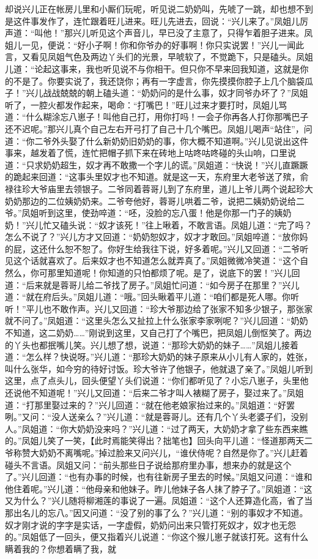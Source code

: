\documentclass[12pt,oneside]{book}
\begin{document}
却说兴儿正在帐房儿里和小厮们玩呢，听见说二奶奶叫，先唬了一跳，却也想不到是这件事发作了，连忙跟着旺儿进来。旺儿先进去，回说：“兴儿来了。”凤姐儿厉声道：“叫他！”那兴儿听见这个声音儿，早已没了主意了，只得乍着胆子进来。凤姐儿一见，便说：“好小子啊！你和你爷办的好事啊！你只实说罢！”兴儿一闻此言，又看见凤姐气色及两边丫头们的光景，早唬软了，不觉跪下，只是磕头。凤姐儿道：“论起这事来，我也听见说不与你相干。但只你不早来回我知道，这就是你的不是了。你要实说了，我还饶你；再有一字虚言，你先摸摸你腔子上几个脑袋瓜子！”兴儿战战兢兢的朝上磕头道：“奶奶问的是什么事，奴才同爷办坏了？”凤姐听了，一腔火都发作起来，喝命：“打嘴巴！”旺儿过来才要打时，凤姐儿骂道：“什么糊涂忘八崽子！叫他自己打，用你打吗！一会子你再各人打你那嘴巴子还不迟呢。”那兴儿真个自己左右开弓打了自己十几个嘴巴。凤姐儿喝声“站住”，问道：“你二爷外头娶了什么新奶奶旧奶奶的事，你大概不知道啊。”兴儿见说出这件事来，越发着了慌，连忙把帽子抓下来在砖地上咕咚咕咚碰的头山响，口里说道：“只求奶奶超生，奴才再不敢撒一个字儿的谎。”凤姐道：“快说！”兴儿直蹶蹶的跪起来回道：“这事头里奴才也不知道。就是这一天，东府里大老爷送了殡，俞禄往珍大爷庙里去领银子。二爷同着蓉哥儿到了东府里，道儿上爷儿两个说起珍大奶奶那边的二位姨奶奶来。二爷夸他好，蓉哥儿哄着二爷，说把二姨奶奶说给二爷。”凤姐听到这里，使劲啐道：“呸，没脸的忘八蛋！他是你那一门子的姨奶奶！”兴儿忙又磕头说：“奴才该死！”往上啾着，不敢言语。凤姐儿道：“完了吗？怎么不说了？”兴儿方才又回道：“奶奶恕奴才，奴才才敢回。”凤姐啐道：“放你妈的屁，这还什么恕不恕了。你好生给我往下说，好多着呢。”兴儿又回道：“二爷听见这个话就喜欢了。后来奴才也不知道怎么就弄真了。”凤姐微微冷笑道：“这个自然么，你可那里知道呢！你知道的只怕都烦了呢。是了，说底下的罢！”兴儿回道：“后来就是蓉哥儿给二爷找了房子。”凤姐忙问道：“如今房子在那里？”兴儿道：“就在府后头。”凤姐儿道：“哦。”回头瞅着平儿道：“咱们都是死人哪。你听听！”平儿也不敢作声。兴儿又回道：“珍大爷那边给了张家不知多少银子，那张家就不问了。”凤姐道：“这里头怎么又扯拉上什么张家李家咧呢？”兴儿回道：“奶奶不知道，这二奶奶……”刚说到这里，又自己打了个嘴巴，把凤姐儿倒怄笑了。两边的丫头也都抿嘴儿笑。兴儿想了想，说道：“那珍大奶奶的妹子……”凤姐儿接着道：“怎么样？快说呀。”兴儿道：“那珍大奶奶的妹子原来从小儿有人家的，姓张，叫什么张华，如今穷的待好讨饭。珍大爷许了他银子，他就退了亲了。”凤姐儿听到这里，点了点头儿，回头便望丫头们说道：“你们都听见了？小忘八崽子，头里他还说他不知道呢！”兴儿又回道：“后来二爷才叫人裱糊了房子，娶过来了。”凤姐道：“打那里娶过来的？”兴儿回道：“就在他老娘家抬过来的。”凤姐道：“好罢咧。”又问：“没人送亲么？”兴儿道：“就是蓉哥儿。还有几个丫头老婆子们，没别人。”凤姐道：“你大奶奶没来吗？”兴儿道：“过了两天，大奶奶才拿了些东西来瞧的。”凤姐儿笑了一笑，【此时焉能笑得出？拙笔也】回头向平儿道：“怪道那两天二爷称赞大奶奶不离嘴呢。”掉过脸来又问兴儿，“谁伏侍呢？自然是你了。”兴儿赶着碰头不言语。凤姐又问：“前头那些日子说给那府里办事，想来办的就是这个了。”兴儿回道：“也有办事的时候，也有往新房子里去的时候。”凤姐又问道：“谁和他住着呢。”兴儿道：“他母亲和他妹子。昨儿他妹子各人抹了脖子了。”凤姐道：“这又为什么？”兴儿随将柳湘莲的事说了一遍。凤姐道：“这个人还算造化高，省了当那出名儿的忘八。”因又问道：“没了别的事了么？”兴儿道：“别的事奴才不知道。奴才刚才说的字字是实话，一字虚假，奶奶问出来只管打死奴才，奴才也无怨的。”凤姐低了一回头，便又指着兴儿说道：“你这个猴儿崽子就该打死。这有什么瞒着我的？你想着瞒了我，就
\end{document}

